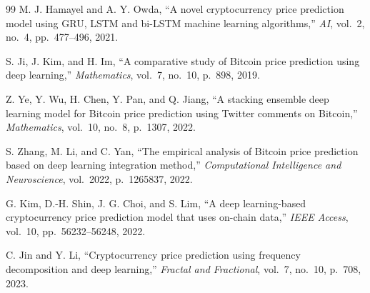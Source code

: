 \documentclass[12pt]{article}
\begin{document}
\begin{thebibliography}{99}
M. J. Hamayel and A. Y. Owda, ``A novel cryptocurrency price prediction model using GRU, LSTM and bi-LSTM machine learning algorithms,'' \textit{AI}, vol.\ 2, no.\ 4, pp.\ 477--496, 2021.

S. Ji, J. Kim, and H. Im, ``A comparative study of Bitcoin price prediction using deep learning,'' \textit{Mathematics}, vol.\ 7, no.\ 10, p.\ 898, 2019.

Z. Ye, Y. Wu, H. Chen, Y. Pan, and Q. Jiang, ``A stacking ensemble deep learning model for Bitcoin price prediction using Twitter comments on Bitcoin,'' \textit{Mathematics}, vol.\ 10, no.\ 8, p.\ 1307, 2022.

S. Zhang, M. Li, and C. Yan, ``The empirical analysis of Bitcoin price prediction based on deep learning integration method,'' \textit{Computational Intelligence and Neuroscience}, vol.\ 2022, p.\ 1265837, 2022.

G. Kim, D.-H. Shin, J. G. Choi, and S. Lim, ``A deep learning-based cryptocurrency price prediction model that uses on-chain data,'' \textit{IEEE Access}, vol.\ 10, pp.\ 56232--56248, 2022.

C. Jin and Y. Li, ``Cryptocurrency price prediction using frequency decomposition and deep learning,'' \textit{Fractal and Fractional}, vol.\ 7, no.\ 10, p.\ 708, 2023.

\end{thebibliography}
\end{document}
